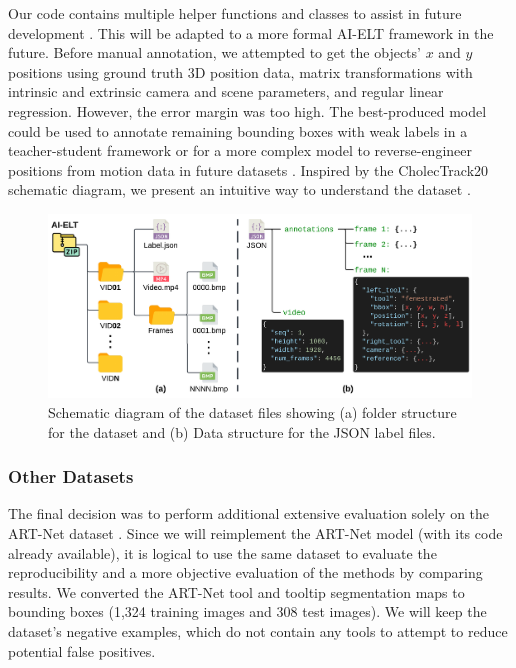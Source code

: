 Our code contains multiple helper functions and classes to assist in future development \cite{choudhry_omarioscmsc-surgical-tool-tracking_2024}. This will be adapted to a more formal AI-ELT framework in the future. Before manual annotation, we attempted to get the objects' $x$ and $y$ positions using ground truth 3D position data, matrix transformations with intrinsic and extrinsic camera and scene parameters, and regular linear regression. However, the error margin was too high. The best-produced model could be used to annotate remaining bounding boxes with weak labels in a teacher-student framework or for a more complex model to reverse-engineer positions from motion data in future datasets \cite{teevno_semi-supervised_2023}. Inspired by the CholecTrack20 schematic diagram, we present an intuitive way to understand the dataset \cite{nwoye_cholectrack20_2023}.

\begin{figure}[htbp]
    \centering
    \vspace*{-2mm}
    \includegraphics[width=\linewidth]{schematic_diagram.png}
    \vspace*{-7.5mm}
    \caption{Schematic diagram of the dataset files showing (a) folder structure for the dataset and (b) Data structure for the JSON label files.}
    \vspace*{-5mm}
    \label{fig:schematic_diagram}
\end{figure}

\subsubsection{Other Datasets}

The final decision was to perform additional extensive evaluation solely on the ART-Net dataset \cite{hasan_detection_2021}. Since we will reimplement the ART-Net model (with its code already available), it is logical to use the same dataset to evaluate the reproducibility and a more objective evaluation of the methods by comparing results. We converted the ART-Net tool and tooltip segmentation maps to bounding boxes (1,324 training images and 308 test images). We will keep the dataset's negative examples, which do not contain any tools to attempt to reduce potential false positives.

